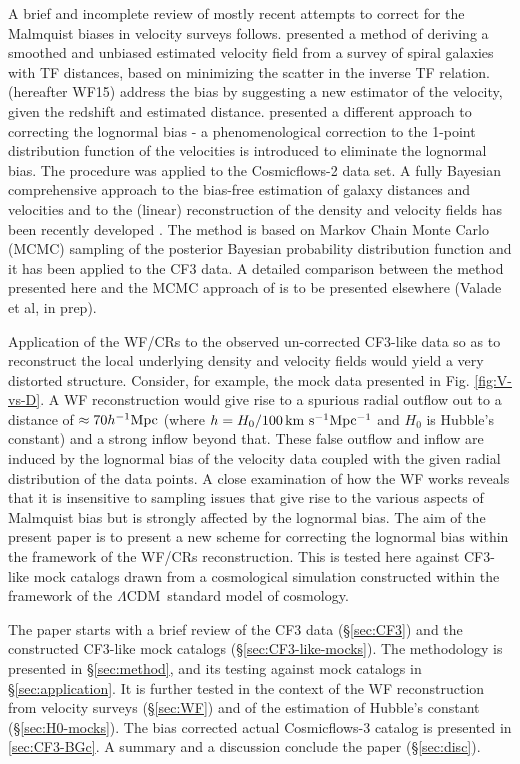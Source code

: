 \documentclass[useAMS,usenatbib]{mn2e}
\newcommand{\kmsMpc}{{\,\rm km \ s^{-1}Mpc^{-1}}}
\newcommand{\hmpc}{{\ifmmode{h^{-1}{\rm Mpc}}\else{$h^{-1}$Mpc}\fi}}
\newcommand{\LCDM}{{$\Lambda$CDM}}
\begin{document}
A brief and incomplete review of mostly recent attempts  to correct for the Malmquist biases in velocity surveys follows.
\cite{1995MNRAS.276.1391N}  
presented a  method of deriving a  smoothed and unbiased estimated velocity  field from a survey of spiral galaxies with TF distances, based on  minimizing the scatter in the  inverse TF relation.
\cite{2015MNRAS.450.1868W} (hereafter WF15) 
address the bias by suggesting  a new estimator of the velocity, given the redshift and estimated distance. 
\cite{2015MNRAS.450.2644S} 
presented a different approach  to correcting the lognormal bias - a phenomenological correction to the 1-point distribution function of the velocities is introduced to eliminate the lognormal bias.   The procedure  was applied to the Cosmicflows-2 data set.
A fully Bayesian comprehensive approach  to the bias-free estimation of galaxy distances and velocities and to the (linear) reconstruction of the density and velocity  fields has been recently developed  \citep{2016MNRAS.457..172L,2019MNRAS.488.5438G}.  
The method is based on 
Markov Chain Monte Carlo (MCMC) sampling of  the posterior Bayesian probability distribution function and it has been applied to the CF3 data. A detailed comparison between the  method  presented here  and the  MCMC  approach of   \cite{2019MNRAS.488.5438G}
is to be presented elsewhere (Valade et al, in prep).

Application of the WF/CRs to the observed un-corrected CF3-like data so as to reconstruct the local underlying  density and  velocity fields would yield a very distorted structure. Consider, for example, the mock data presented  in Fig. \ref{fig:V-vs-D}. A WF reconstruction would give rise  to a spurious  radial outflow out to a distance of $\approx70\hmpc$ (where $h=H_0/100\kmsMpc$  and $H_0$ is Hubble's constant) and a strong inflow  beyond that. These false outflow and inflow are induced  by  the lognormal bias of the velocity data coupled with the given radial distribution of the data points. A close examination of how the WF works reveals that it is insensitive to sampling issues that give rise to the various aspects of Malmquist bias but is strongly affected by the lognormal bias. The aim of the present paper is to present a new scheme for correcting the lognormal bias within the framework of the WF/CRs reconstruction. This is tested here against CF3-like mock  catalogs drawn  from a cosmological  simulation constructed within the framework of the \LCDM\  standard  model of cosmology. 

The paper starts with a brief review of the CF3 data (\S \ref{sec:CF3}) and the constructed CF3-like mock catalogs (\S \ref{sec:CF3-like-mocks}). 
The methodology is  presented in \S \ref{sec:method},
and its testing against mock catalogs in \S \ref{sec:application}.
It is further tested in the context of the WF reconstruction from velocity surveys (\S \ref{sec:WF}) and of the estimation of Hubble's constant
(\S \ref{sec:H0-mocks}).
The bias corrected actual Cosmicflows-3 catalog is presented in \ref{sec:CF3-BGc}.
A summary and a discussion conclude the paper (\S \ref{sec:disc}).
\end{document}
